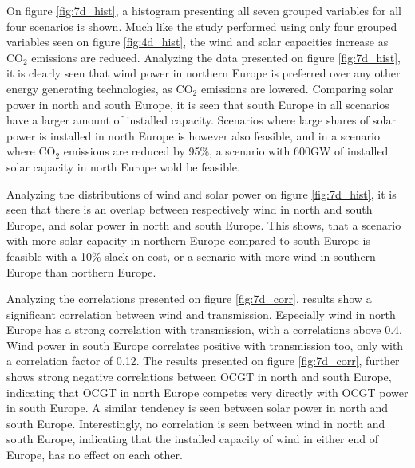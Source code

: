 On figure \ref{fig:7d_hist}, a histogram presenting all seven grouped variables for all four scenarios is shown. Much like the study performed using only four grouped variables seen on figure \ref{fig:4d_hist}, the wind and solar capacities increase as $\text{CO}_2$ emissions are reduced.  
Analyzing the data presented on figure \ref{fig:7d_hist}, it is clearly seen that wind power in northern Europe is preferred over any other energy generating technologies, as $\text{CO}_2$ emissions are lowered. Comparing solar power in north and south Europe, it is seen that south Europe in all scenarios have a larger amount of installed capacity. Scenarios where large shares of solar power is installed in north Europe is however also feasible, and in a scenario where $\text{CO}_2$ emissions are reduced by 95\%, a scenario with 600GW of installed solar capacity in north Europe wold be feasible. 

Analyzing the distributions of wind and solar power on figure \ref{fig:7d_hist}, it is seen that there is an overlap between respectively wind in north and south Europe, and solar power in north and south Europe. This shows, that a scenario with more solar capacity in northern Europe compared to south Europe is feasible with a 10\% slack on cost, or a scenario with more wind in southern Europe than northern Europe. 

Analyzing the correlations presented on figure \ref{fig:7d_corr}, results show a significant correlation between wind and transmission. Especially wind in north Europe has a strong correlation with transmission, with a correlations above 0.4. Wind power in south Europe correlates positive with transmission too, only with a correlation factor of 0.12. 
The results presented on figure \ref{fig:7d_corr}, further shows strong negative correlations between OCGT in north and south Europe, indicating that OCGT in north Europe competes very directly with OCGT power in south Europe. A similar tendency is seen between solar power in north and south Europe. Interestingly, no correlation is seen between wind in north and south Europe, indicating that the installed capacity of wind in either end of Europe, has no effect on each other. 

